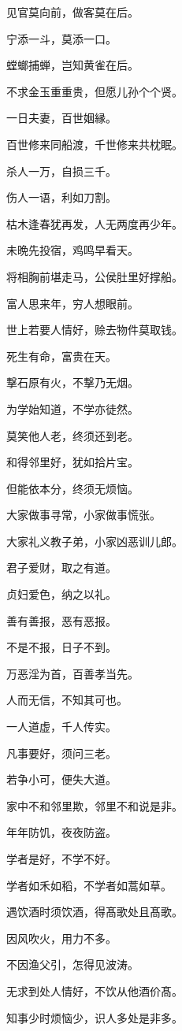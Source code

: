 \documentclass[12pt,oneside]{book}
\begin{document}
见官莫向前，做客莫在后。

宁添一斗，莫添一口。

螳螂捕蝉，岂知黄雀在后。

不求金玉重重贵，但愿儿孙个个贤。

一日夫妻，百世姻縁。

百世修来同船渡，千世修来共枕眠。

杀人一万，自损三千。

伤人一语，利如刀割。

枯木逢春犹再发，人无两度再少年。

未晩先投宿，鸡鸣早看天。

将相胸前堪走马，公侯肚里好撑船。

富人思来年，穷人想眼前。

世上若要人情好，赊去物件莫取钱。

死生有命，富贵在天。

撃石原有火，不撃乃无烟。

为学始知道，不学亦徒然。

莫笑他人老，终须还到老。

和得邻里好，犹如拾片宝。

但能依本分，终须无烦恼。

大家做事寻常，小家做事慌张。

大家礼义教子弟，小家凶恶训儿郎。

君子爱财，取之有道。

贞妇爱色，纳之以礼。

善有善报，恶有恶报。

不是不报，日子不到。

万恶淫为首，百善孝当先。

人而无信，不知其可也。

一人道虚，千人传实。

凡事要好，须问三老。

若争小可，便失大道。

家中不和邻里欺，邻里不和说是非。

年年防饥，夜夜防盗。

学者是好，不学不好。

学者如禾如稻，不学者如蒿如草。

遇饮酒时须饮酒，得髙歌处且髙歌。

因风吹火，用力不多。

不因渔父引，怎得见波涛。

无求到处人情好，不饮从他酒价髙。

知事少时烦恼少，识人多处是非多。
\end{document}
